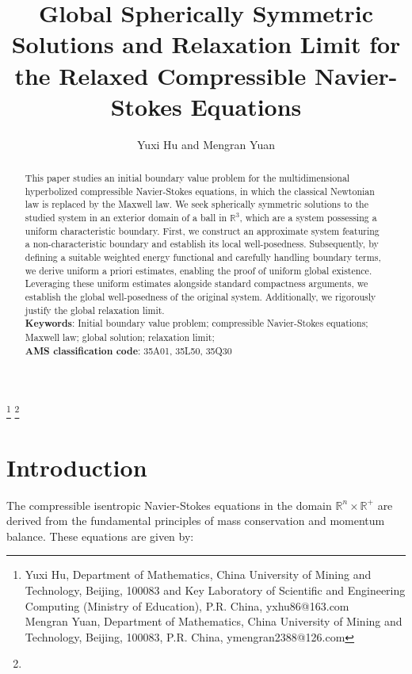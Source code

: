 \documentclass[10pt,reqno]{amsart}
\numberwithin{equation}{section}
\begin{document}
	\title[Spherically symmetric solutions for relaxed CNS]{Global Spherically Symmetric Solutions and Relaxation Limit for the Relaxed Compressible Navier-Stokes Equations}
	\author{Yuxi Hu and Mengran Yuan}
	\thanks{\noindent Yuxi Hu, Department of Mathematics, China University of Mining and Technology, Beijing, 100083 and Key Laboratory of Scientific and Engineering Computing (Ministry of Education), P.R. China, yxhu86@163.com\\
		\indent Mengran Yuan, Department of Mathematics, China University of Mining and Technology, Beijing, 100083, P.R. China,  ymengran2388@126.com
	}
	\thanks{\noindent  }
	\begin{abstract}
		This paper studies an initial boundary value problem for the multidimensional hyperbolized compressible Navier-Stokes equations, in which the classical Newtonian law is replaced by the Maxwell law. We seek spherically symmetric solutions to the studied system in an exterior domain of a ball in $\mathbb R^3$, which are a system possessing a uniform characteristic boundary.
		First, we construct an approximate system featuring a non-characteristic boundary and establish its local well-posedness. Subsequently, by defining a suitable weighted energy functional and carefully handling boundary terms, we derive uniform a priori estimates, enabling the proof of uniform global existence. Leveraging these uniform estimates alongside standard compactness arguments, we establish the global well-posedness of the original system. Additionally, we rigorously justify the global relaxation limit.  \\
		{\bf Keywords}:  Initial boundary value problem; compressible Navier-Stokes equations; Maxwell law; global solution; relaxation limit; \\
		{\bf AMS classification code}: 35A01, 35L50, 35Q30 
	\end{abstract}
	\maketitle
	
	
	\section{Introduction}\label{sec1}
	The compressible isentropic Navier-Stokes equations in the domain \(\mathbb{R}^n \times \mathbb{R}^{+}\) are derived from the fundamental principles of mass conservation and momentum balance. These equations are given by:
	
\end{document}
